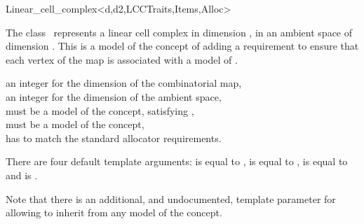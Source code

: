 \ccRefPageBegin
\begin{ccRefClass}{Linear_cell_complex<d,d2,LCCTraits,Items,Alloc>}


\ccDefinition
  
The class \ccRefName\ represents a linear cell complex in dimension ,
in an ambient space of dimension . This is a model of the concept of
 adding a requirement to ensure that
each vertex of the map is associated with a
model of .

\ccIsModel
{}

\ccInheritsFrom
{}

\ccParameters
{} an integer for the dimension of the combinatorial map,\\
 an integer for the dimension of the ambient space,\\
 must be a model of the  concept, satisfying ,\\
 must be a model of the  concept,\\
 has to match the standard allocator requirements. 

There are four default template arguments:
 is equal to ,
 is equal to ,
 is equal to  and
 is .

\begin{ccAdvanced}
  Note that there is an additional, and undocumented, template
  parameter  for
   allowing
  to inherit from any model of the  concept.
\end{ccAdvanced}


\end{ccRefClass}
